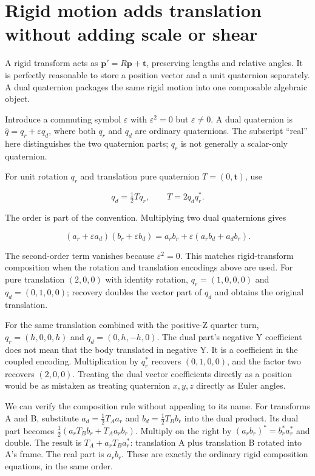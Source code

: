 \section{Rigid motion adds translation without adding scale or shear}\label{01-foundations-i-ch019-rigid-motion-adds-translation-without-adding-scale-or-shear}

\hypertarget{01-foundations-i-ch019-rigid-motion-adds-translation-without-adding-scale-or-shear}{}

A rigid transform acts as \(\mathbf p'=R\mathbf p+\mathbf t\), preserving lengths and relative angles. It is perfectly reasonable to store a position vector and a unit quaternion separately. A dual quaternion packages the same rigid motion into one composable algebraic object.

Introduce a commuting symbol \(\varepsilon\) with \(\varepsilon^2=0\) but \(\varepsilon\ne0\). A dual quaternion is \(\widehat q=q_r+\varepsilon q_d\), where both \(q_r\) and \(q_d\) are ordinary quaternions. The subscript ``real'' here distinguishes the two quaternion parts; \(q_r\) is not generally a scalar-only quaternion.

For unit rotation \(q_r\) and translation pure quaternion \(T=(0,\mathbf t)\), use

\[
q_d=\tfrac12Tq_r,\qquad T=2q_dq_r^*.
\]

The order is part of the convention. Multiplying two dual quaternions gives

\[
(a_r+\varepsilon a_d)(b_r+\varepsilon b_d)
=a_rb_r+\varepsilon(a_rb_d+a_db_r).
\]

The second-order term vanishes because \(\varepsilon^2=0\). This matches rigid-transform composition when the rotation and translation encodings above are used. For pure translation \((2,0,0)\) with identity rotation, \(q_r=(1,0,0,0)\) and \(q_d=(0,1,0,0)\); recovery doubles the vector part of \(q_d\) and obtains the original translation.

For the same translation combined with the positive-Z quarter turn, \(q_r=(h,0,0,h)\) and \(q_d=(0,h,-h,0)\). The dual part's negative Y coefficient does not mean that the body translated in negative Y. It is a coefficient in the coupled encoding. Multiplication by \(q_r^*\) recovers \((0,1,0,0)\), and the factor two recovers \((2,0,0)\). Treating the dual vector coefficients directly as a position would be as mistaken as treating quaternion \(x,y,z\) directly as Euler angles.

We can verify the composition rule without appealing to its name. For transforms A and B, substitute \(a_d=\tfrac12T_Aa_r\) and \(b_d=\tfrac12T_Bb_r\) into the dual product. Its dual part becomes \(\tfrac12(a_rT_Bb_r+T_Aa_rb_r)\). Multiply on the right by \((a_rb_r)^*=b_r^*a_r^*\) and double. The result is \(T_A+a_rT_Ba_r^*\): translation A plus translation B rotated into A's frame. The real part is \(a_rb_r\). These are exactly the ordinary rigid composition equations, in the same order.

